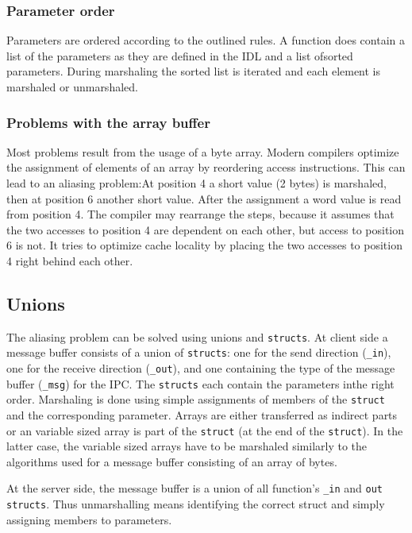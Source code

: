 \subsubsection{Parameter order}
Parameters are ordered according to the outlined rules.  A function does
contain a list of the parameters as they are defined in the IDL and a list
ofsorted parameters.  During marshaling the sorted list is iterated and each
element is marshaled or unmarshaled.

\subsubsection{Problems with the array buffer}

Most problems result from the usage of a byte array.  Modern compilers
optimize the assignment of elements of an array by reordering access
instructions.  This can lead to an aliasing problem:At position 4 a short
value (2 bytes) is marshaled, then at position 6 another short value.  After
the assignment a word value is read from position 4.  The compiler may
rearrange the steps, because it assumes that the two accesses to position 4
are dependent on each other, but access to position 6 is not.  It tries to
optimize cache  locality by placing the two accesses to position 4 right
behind each other.

\subsection{Unions}

The aliasing problem can be solved using unions and \verb|structs|.  At
client side a message buffer consists of a union of \verb|structs|: one for
the send direction (\verb|_in|), one for the receive direction
(\verb|_out|), and one containing the type of the message buffer
(\verb|_msg|) for the IPC.  The \verb|structs| each contain the parameters
inthe right order.  Marshaling is done using simple assignments of members
of the  \verb|struct| and the corresponding parameter. Arrays are
either transferred as indirect parts or an variable sized array is part of
the \verb|struct| (at the end of the \verb|struct|).  In the latter case,
the variable sized arrays have to be marshaled similarly to the algorithms
used for a message buffer consisting of an array of bytes.

At the server side, the message buffer is a union of all function's \verb|_in|
and \verb|out| \verb|structs|.  Thus unmarshalling means identifying the
correct struct and simply assigning members to parameters.

